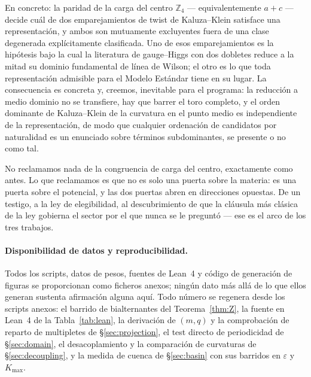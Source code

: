 \documentclass[11pt,a4paper]{article}
\newcommand{\ZZ}{\mathbb{Z}}
\begin{document}
En concreto: la paridad de la carga del centro
$\ZZ_4$ --- equivalentemente $a+c$ --- decide cuál de dos emparejamientos de twist de
Kaluza--Klein satisface una representación, y ambos son mutuamente excluyentes fuera de una
clase degenerada explícitamente clasificada. Uno de esos emparejamientos es la hipótesis bajo
la cual la literatura de gauge--Higgs con dos dobletes reduce a la mitad su dominio fundamental
de línea de Wilson; el otro es lo que toda representación admisible para el Modelo Estándar
tiene en su lugar. La consecuencia es concreta y, creemos, inevitable para el programa: la
reducción a medio dominio no se transfiere, hay que barrer el toro completo, y el orden
dominante de Kaluza--Klein de la curvatura en el punto medio es independiente de la
representación, de modo que cualquier ordenación de candidatos por naturalidad es un enunciado
sobre términos subdominantes, se presente o no como tal.

No reclamamos nada de la congruencia de carga del centro, exactamente como antes. Lo que
reclamamos es que no es solo una puerta sobre la materia: es una puerta sobre el potencial, y
las dos puertas abren en direcciones opuestas. De un testigo, a la ley de elegibilidad, al
descubrimiento de que la cláusula más clásica de la ley gobierna el sector por el que nunca se
le preguntó --- ese es el arco de los tres trabajos.

\paragraph{Disponibilidad de datos y reproducibilidad.} Todos los scripts, datos de pesos,
fuentes de Lean~4 y código de generación de figuras se proporcionan como ficheros anexos;
ningún dato más allá de lo que ellos generan sustenta afirmación alguna aquí. Todo número se
regenera desde los scripts anexos: el barrido de bialternantes del Teorema~\ref{thm:Z}, la
fuente en Lean~4 de la Tabla~\ref{tab:lean}, la derivación de $(m,q)$ y la comprobación de
reparto de multipletes de \S\ref{sec:projection}, el test directo de periodicidad de
\S\ref{sec:domain}, el desacoplamiento y la comparación de curvaturas de
\S\ref{sec:decoupling}, y la medida de cuenca de \S\ref{sec:basin} con sus barridos en
$\varepsilon$ y $K_{\max}$.
\end{document}
